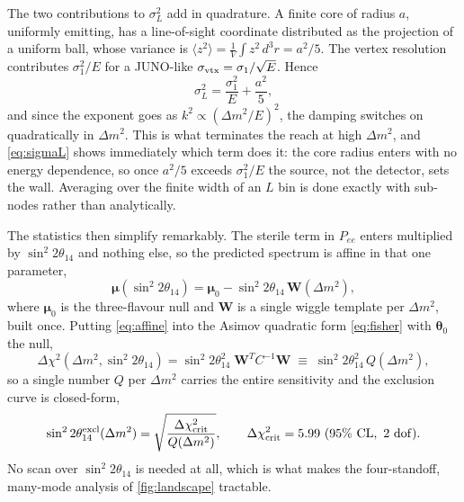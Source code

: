 \documentclass[aps,prd,superscriptaddress,nofootinbib,longbibliography,notitlepage,11pt]{revtex4-2}
\newcommand{\dm}[1]{\Delta m^2_{#1}}
\newcommand{\st}[1]{\sin^2 2\theta_{#1}}
\begin{document}
The two contributions to $\sigma_L^{2}$ add in quadrature.  A finite core of radius $a$,
uniformly emitting, has a line-of-sight coordinate distributed as the projection of a
uniform ball, whose variance is
$\langle z^{2}\rangle=\tfrac{1}{V}\!\int z^{2}\,d^{3}r=a^{2}/5$.  The vertex resolution
contributes $\sigma_1^{2}/E$ for a JUNO-like $\sigma_{\rm vtx}=\sigma_1/\sqrt{E}$.  Hence
\begin{equation}
\sigma_L^{2}=\frac{\sigma_1^{2}}{E}+\frac{a^{2}}{5},
\label{eq:sigmaL}
\end{equation}
and since the exponent goes as $k^{2}\propto(\dm{}/E)^{2}$, the damping switches on
quadratically in $\dm{}$.  This is what terminates the reach at high $\dm{}$, and
\cref{eq:sigmaL} shows immediately which term does it: the core radius enters with no
energy dependence, so once $a^{2}/5$ exceeds $\sigma_1^{2}/E$ the source, not the detector,
sets the wall.  Averaging over the finite width of an $L$ bin is done exactly with
sub-nodes rather than analytically.

The statistics then simplify remarkably.  The sterile term in $P_{ee}$ enters multiplied by
$\st{14}$ and nothing else, so the predicted spectrum is affine in that one parameter,
\begin{equation}
\bm\mu(\st{14})=\bm\mu_0-\st{14}\,\bm W(\dm{}),
\label{eq:affine}
\end{equation}
where $\bm\mu_0$ is the three-flavour null and $\bm W$ is a single wiggle template per
$\dm{}$, built once.  Putting \cref{eq:affine} into the Asimov quadratic form
\cref{eq:fisher} with $\bm\theta_0$ the null,
\begin{equation}
\Delta\chi^{2}(\dm{},\st{14})=\st{14}^{2}\;\bm W^{T}C^{-1}\bm W
\;\equiv\;\st{14}^{2}\,Q(\dm{}),
\label{eq:sterilechi2}
\end{equation}
so a single number $Q$ per $\dm{}$ carries the entire sensitivity and the exclusion curve
is closed-form,
\begin{equation}
\st{14}^{\rm excl}(\dm{})=\sqrt{\frac{\Delta\chi^{2}_{\rm crit}}{Q(\dm{})}},
\qquad \Delta\chi^{2}_{\rm crit}=5.99\ (95\%\ \mathrm{CL},\ 2\ \mathrm{dof}).
\label{eq:sterilelimit}
\end{equation}
No scan over $\st{14}$ is needed at all, which is what makes the four-standoff, many-mode
analysis of \cref{fig:landscape} tractable.
\end{document}
